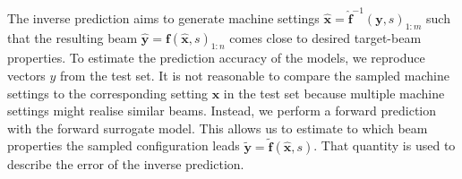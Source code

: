 \documentclass[a4paper, 12pt, version-1-compatibility]{article}
\def\opal{OPAL}
\newcommand{\myvec}[1]{\mathbf{#1}}
\begin{document}
The inverse prediction aims to generate machine settings $\hat{\myvec{x}} = \myvec{\hat{f}}^{-1}(\myvec{y}, s)_{1:m}$ such that the resulting beam $\myvec{\hat{y}} = \myvec{f}(\myvec{\hat{x}}, s)_{1:n}$ comes close to desired target-beam properties. To estimate the prediction accuracy of the models, we reproduce vectors $y$ from the test set. It is not reasonable to compare the sampled machine settings to the corresponding setting $\myvec{x}$ in the test set because multiple machine settings might realise similar beams. Instead, we perform a forward prediction with the forward surrogate model. This allows us to estimate to which beam properties the sampled configuration leads $\myvec{\tilde{y}} = \myvec{\tilde{f}}(\myvec{\hat{x}}, s)$. That quantity is used to describe the error of the inverse prediction. 
\end{document}

